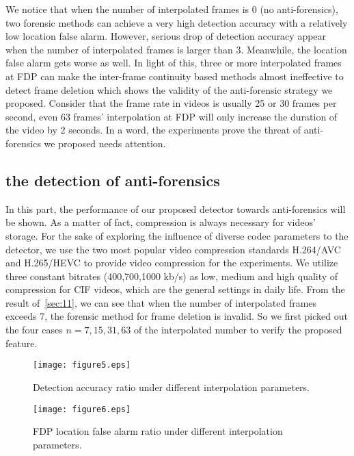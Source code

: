 \documentclass[pdftex,twocolumn,epjc3]{svjour3}          %
\begin{document}
We notice that when the number of interpolated frames is 0 (no anti-forensics), two forensic methods can achieve a very high detection accuracy with a relatively low location false alarm. However, serious drop of detection accuracy appear when the number of interpolated frames is larger than 3. Meanwhile, the location false alarm gets worse as well. In light of this, three or more interpolated frames at FDP can make the inter-frame continuity based methods almost ineffective to detect frame deletion which shows the validity of the anti-forensic strategy we proposed. Consider that the frame rate in videos is usually 25 or 30 frames per second, even 63 frames' interpolation at FDP will only increase the duration of the video by 2 seconds. In a word, the experiments prove the threat of anti-forensics we proposed needs attention.

\subsection{the detection of anti-forensics}
\label{sec:sub41}
In this part, the performance of our proposed detector towards anti-forensics will be shown. As a matter of fact, compression is always necessary for videos' storage. For the sake of exploring the influence of diverse codec parameters to the detector, we use the two most popular video compression standards H.264/AVC and H.265/HEVC to provide video compression for the experiments. We utilize three constant bitrates (400,700,1000 kb/s) as low, medium and high quality of compression for CIF videos, which are the general settings in daily life. From the result of~\ref{sec:11}, we can see that when the number of interpolated frames exceeds 7, the forensic method for frame deletion is invalid. So we first picked out the four cases $n=7,15,31,63$ of the interpolated number to verify the proposed feature.

\begin{figure}[!t]
 \texttt{[image: figure5.eps]}
 \caption{Detection accuracy ratio under different interpolation parameters.}\label{fig:6}
\end{figure}

\begin{figure}[!t]
 \texttt{[image: figure6.eps]}
 \caption{FDP location false alarm ratio under different interpolation parameters.}\label{fig:7}
\end{figure}
\end{document}

